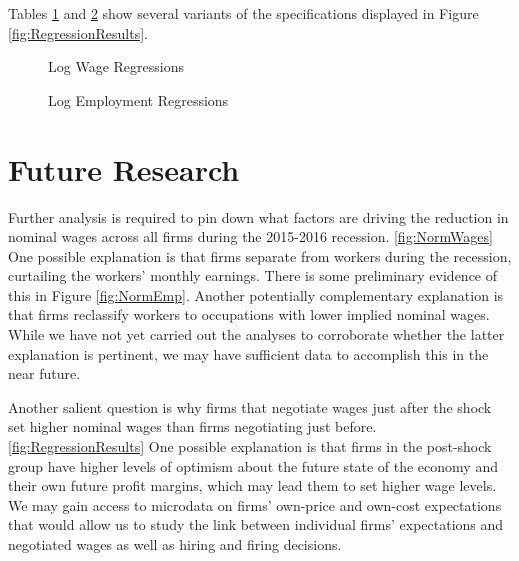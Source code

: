 \documentclass[12pt]{article}
\begin{document}
	Tables \ref{tab:wage_reg} and \ref{tab:emp_reg} show several variants of the specifications displayed in Figure \ref{fig:RegressionResults}. 
		\begin{figure}[!ht]
				\caption{Log Wage Regressions}
				\label{tab:wage_reg}
				\tiny{}
		\end{figure}

		\begin{figure}[!ht]
			\caption{Log Employment Regressions}
			\label{tab:emp_reg}
			\tiny{}
		\end{figure}

	\section{Future Research}
	Further analysis is required to pin down what factors are driving the reduction in nominal wages across all firms during the 2015-2016 recession. \ref{fig:NormWages} One possible explanation is that firms separate from workers during the recession, curtailing the workers' monthly earnings. There is some preliminary evidence of this in Figure \ref{fig:NormEmp}. Another potentially complementary explanation is that firms reclassify workers to occupations with lower implied nominal wages. While we have not yet carried out the analyses to corroborate whether the latter explanation is pertinent, we may have sufficient data to accomplish this in the near future.

	Another salient question is why firms that negotiate wages just after the shock set higher nominal wages than firms negotiating just before. \ref{fig:RegressionResults} One possible explanation is that firms in the post-shock group have higher levels of optimism about the future state of the economy and their own future profit margins, which may lead them to set higher wage levels. We may gain access to microdata on firms' own-price and own-cost expectations that would allow us to study the link between individual firms' expectations and negotiated wages as well as hiring and firing decisions.  
\end{document}
